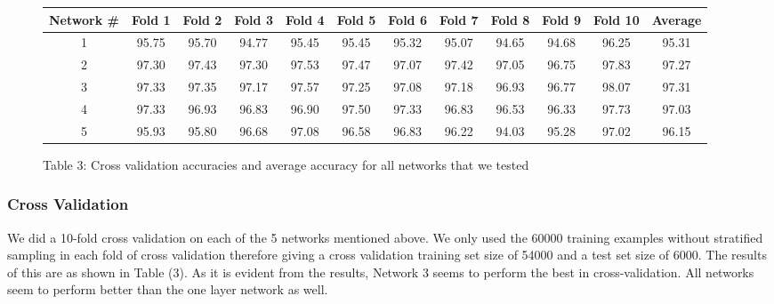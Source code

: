 \documentclass[10pt,twocolumn,letterpaper]{article}
\begin{document}
\begin{figure}
\begin{center}
\begin{tabular}{|c|c|c|c|c|c|c|c|c|c|c|c|}
	\hline
	\textbf{Network \#} & \textbf{Fold 1} & \textbf{Fold 2} & \textbf{Fold 3} & \textbf{Fold 4} & \textbf{Fold 5} & \textbf{Fold 6} & \textbf{Fold 7} & \textbf{Fold 8} & \textbf{Fold 9} & \textbf{Fold 10} & \textbf{Average}\\ \hline \hline
	1 & 95.75 & 95.70 & 94.77 & 95.45 & 95.45 & 95.32 & 95.07 & 94.65 & 94.68 & 96.25 & 95.31\\ \hline
	2 & 97.30 & 97.43 & 97.30 & 97.53 & 97.47 & 97.07 & 97.42 & 97.05 & 96.75 & 97.83 & 97.27\\ \hline
	3 & 97.33 & 97.35 & 97.17 & 97.57 & 97.25 & 97.08 & 97.18 & 96.93 & 96.77 & 98.07 & 97.31\\ \hline
	4 & 97.33 & 96.93 & 96.83 & 96.90 & 97.50 & 97.33 & 96.83 & 96.53 & 96.33 & 97.73 & 97.03\\ \hline
	5 & 95.93 & 95.80 & 96.68 & 97.08 & 96.58 & 96.83 & 96.22 & 94.03 & 95.28 & 97.02 & 96.15\\ \hline
\end{tabular}
\end{center}
\begin{center}
	Table 3: Cross validation accuracies and average accuracy for all networks that we tested
\end{center}
\end{figure}

\subsubsection{Cross Validation}
We did a 10-fold cross validation on each of the 5 networks mentioned above. We only used the 60000 training examples without stratified sampling in each fold of cross validation therefore giving a cross validation training set size of 54000 and a test set size of 6000. The results of this are as shown in Table (3). As it is evident from the results, Network 3 seems to perform the best in cross-validation. All networks seem to perform better than the one layer network as well.
\end{document}
